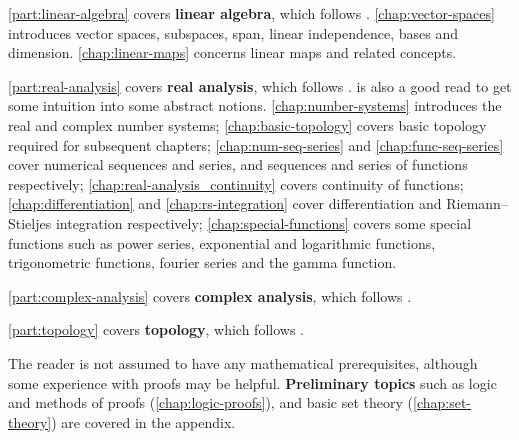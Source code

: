\iflinalg
\cref{part:linear-algebra} covers \textbf{linear algebra}, which follows \cite{axler}. \cref{chap:vector-spaces} introduces vector spaces, subspaces, span, linear independence, bases and dimension. \cref{chap:linear-maps} concerns linear maps and related concepts.
\fi

\ifranalysis
\cref{part:real-analysis} covers \textbf{real analysis}, which follows \cite{rudin,apostol,bartle-sherbert}. \cite{alcock} is also a good read to get some intuition into some abstract notions. \cref{chap:number-systems} introduces the real and complex number systems; \cref{chap:basic-topology} covers basic topology required for subsequent chapters; \cref{chap:num-seq-series} and \cref{chap:func-seq-series} cover numerical sequences and series, and sequences and series of functions respectively; \cref{chap:real-analysis_continuity} covers continuity of functions; \cref{chap:differentiation} and \cref{chap:rs-integration} cover differentiation and Riemann--Stieljes integration respectively; \cref{chap:special-functions} covers some special functions such as power series, exponential and logarithmic functions, trigonometric functions, fourier series and the gamma function.
\fi

\ifcanalysis
\cref{part:complex-analysis} covers \textbf{complex analysis}, which follows \cite{ahlfors,lang}.
\fi

\iftop
\cref{part:topology} covers \textbf{topology}, which follows \cite{munkres}.
\fi

\ifappend
The reader is not assumed to have any mathematical prerequisites, although some experience with proofs may be helpful. \textbf{Preliminary topics} such as logic and methods of proofs (\cref{chap:logic-proofs}), and basic set theory (\cref{chap:set-theory}) are covered in the appendix.
\fi

